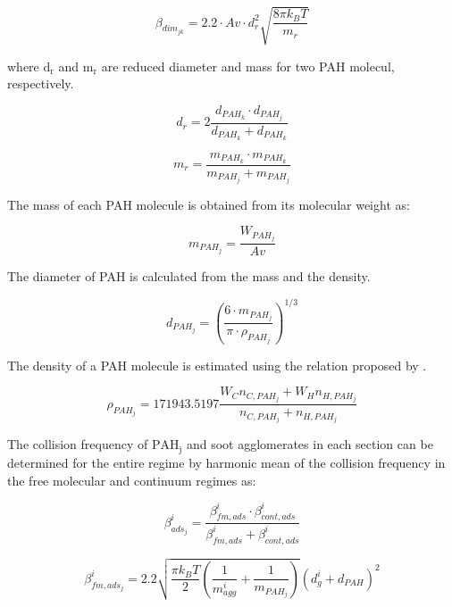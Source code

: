 \begin{equation}
	\beta_{dim_{jk}}=
	2.2 \cdot Av \cdot d^2_{r} \sqrt{\frac{8 \pi k_B T}{m_{r}}}
	\label{eqn:betadim}
\end{equation}

where $\mathrm{d_{r}}$ and $\mathrm{m_{r}}$ are reduced diameter and mass for two PAH molecul, respectively.

\begin{equation}
	d_{r}=
	2\frac{d_{PAH_k}\cdot d_{PAH_j}}{d_{PAH_k}+d_{PAH_k}}
	\label{eqn:drPAH}
\end{equation}

\begin{equation}
	m_{r}=
		\frac{m_{PAH_k}\cdot m_{PAH_k}}{m_{PAH_j}+ m_{PAH_j}}
	\label{eqn:mrPAH}
\end{equation}

The mass of each PAH molecule is obtained from its molecular weight as:

\begin{equation}
	m_{PAH_j}=
	\frac{W_{PAH_j}}{Av}
	\label{eqn:mPAH}
\end{equation}

The diameter of PAH is calculated from the mass and the density.

\begin{equation}
	d_{PAH_j}=
	\left(
		\frac{6\cdot m_{PAH_j}}{\pi\cdot\rho_{PAH_j}}
	\right)^{1/3}
	\label{eqn:dPAH}
\end{equation}

The density of a PAH molecule is estimated using the relation proposed by \citet{johansson2016formation}.

\begin{equation}
	\rho_{PAH_j}= 
	171943.5197
	\frac{W_{C}n_{C,PAH_j}+W_{H}n_{H,PAH_j}}
	{n_{C,PAH_j}+n_{H,PAH_j}}
	\label{eqn:rhoPAH}
\end{equation}

The collision frequency of $\mathrm{PAH_j}$ and soot agglomerates in each section can be determined for the entire regime by harmonic mean of the collision frequency in the free molecular and continuum regimes as:

\begin{equation}
	\beta^i_{ads_j}=
	\frac{\beta^i_{fm, ads}\cdot \beta^i_{cont, ads}}
	{\beta^i_{fm, ads}+\beta^i_{cont, ads}}
	\label{eqn:betahmads}
\end{equation}

\begin{equation}
	\beta^i_{fm, ads_j}=
	2.2 
	\sqrt{
		\frac{\pi k_B T}{2}\left(\frac{1}{m^i_{agg}}+\frac{1}{m_{PAH_j}}\right)
	}
	\left(d^i_g+d_{PAH}\right)^2
	\label{eqn:betafmads}
\end{equation}

